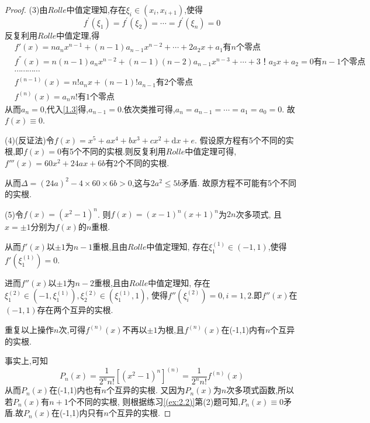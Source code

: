 \documentclass[lang=cn,newtx,10pt,scheme=chinese]{../Template/elegantbook}
\begin{document}
\begin{exercise}
\begin{proof}
    (3)由$Rolle$中值定理知,存在$\xi_i\in(x_i,x_{i+1})$,使得
    \begin{equation}
        f^{\prime}\left( \xi _1 \right) =f^{\prime}\left( \xi _2 \right) =\cdots =f^{\prime}\left( \xi _n \right) =0
        \nonumber
    \end{equation}
    反复利用$Rolle$中值定理,得
    \begin{align}
            &f'\left( x \right) =na_nx^{n-1}+\left( n-1 \right) a_{n-1}x^{n-2}+\cdots +2a_2x+a_1\text{有}n\text{个零点}
            \\
            &f^{''}(x)=n\left( n-1 \right) a_nx^{n-2}+\left( n-1 \right) \left( n-2 \right) a_{n-1}x^{n-3}+\cdots +3\text{！}a_3x+a_2=0\text{有}n-1\text{个零点}
            \\
            &\cdots \cdots \cdots \cdots \nonumber
            \\
            &f^{(n-1)}(x)=n!a_nx+\left( n-1 \right) !a_{n-1}\text{有}2\text{个零点} \label{1.3}
            \\
            &f^{(n)}(x)=a_nn!\text{有}1\text{个零点}
    \end{align}
    从而$a_n=0$,代入\eqref{1.3}得,$a_{n-1}=0$.依次类推可得,$a_n=a_{n-1}=\cdots=a_1=a_0=0$.
    故$f(x)\equiv 0$.

    (4)(反证法)令$f(x)=x^5+ax^4+bx^3+cx^2+\mathrm{d}x+e$.
    假设原方程有5个不同的实根,即$f(x)=0$有5个不同的实根.则反复利用$Rolle$中值定理可得,
    $f'''(x)=60x^2+24ax+6b$有2个不同的实根.
    
    从而$\Delta=(24a)^2-4\times 60\times 6b>0$,这与$2a^2\leqslant 5b$矛盾.
    故原方程不可能有5个不同的实根.

    (5)令$f(x)=\left( x^2-1 \right) ^n$.
    则$f(x)=\left( x-1 \right) ^n\left( x+1 \right) ^n$为$2n$次多项式,
    且$x=\pm1$分别为$f(x)$的$n$重根.

    从而$f'(x)$以$\pm1$为$n-1$重根,且由$Rolle$中值定理知,
    存在$\xi _{1}^{(1)}\in(-1,1)$,使得$f'(\xi _{1}^{(1)})=0$.

    进而$f''(x)$以$\pm1$为$n-2$重根,且由$Rolle$中值定理知,
    存在$\xi _{1}^{(2)}\in(-1,\xi _{1}^{(1)}),\xi _{2}^{(2)}\in(\xi _{1}^{(1)},1)$,
    使得$f''(\xi _{i}^{(2)})=0,i=1,2$.即$f''(x)$在$(-1,1)$存在两个互异的实根.

    重复以上操作$n$次,可得$f^{(n)}(x)$不再以$\pm1$为根,且$f^{(n)}(x)$在(-1,1)内有$n$个互异的实根.

    事实上,可知
    \begin{equation}
        P_n\left( x \right) =\frac{1}{2^nn!}\left[ \left( x^2-1 \right) ^n \right] ^{\left( n \right)}
        =\frac{1}{2^nn!}f^{(n)}(x)
        \nonumber
    \end{equation}
    从而$P_n(x)$在(-1,1)内也有$n$个互异的实根.
    又因为$P_n(x)$为$n$次多项式函数,所以若$P_n(x)$有$n+1$个不同的实根,
    则根据练习\eqref{(ex:2.2)}第(2)题可知,$P_n(x)\equiv 0$矛盾.故$P_n(x)$在(-1,1)内只有$n$个互异的实根.


\end{proof}
\end{exercise}
\end{document}
